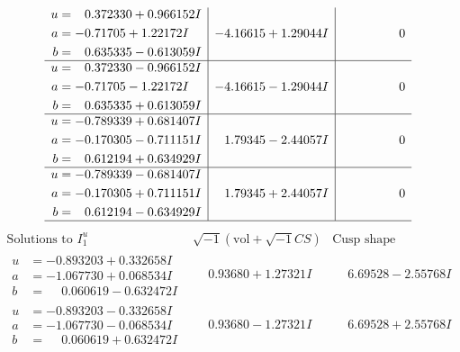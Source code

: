 \documentclass[1p]{elsarticle_modified}
\theoremstyle{definition}
\newcommand{\I}{\sqrt{-1}}
\begin{document}
$$\begin{array}{c|c|c}
\begin{aligned}
u &= \phantom{-}0.372330 + 0.966152 I \\
a &= -0.71705 + 1.22172 I \\
b &= \phantom{-}0.635335 - 0.613059 I\end{aligned}
 & -4.16615 + 1.29044 I & \phantom{-0.000000 } 0 \\ \hline\begin{aligned}
u &= \phantom{-}0.372330 - 0.966152 I \\
a &= -0.71705 - 1.22172 I \\
b &= \phantom{-}0.635335 + 0.613059 I\end{aligned}
 & -4.16615 - 1.29044 I & \phantom{-0.000000 } 0 \\ \hline\begin{aligned}
u &= -0.789339 + 0.681407 I \\
a &= -0.170305 - 0.711151 I \\
b &= \phantom{-}0.612194 + 0.634929 I\end{aligned}
 & \phantom{-}1.79345 - 2.44057 I & \phantom{-0.000000 } 0 \\ \hline\begin{aligned}
u &= -0.789339 - 0.681407 I \\
a &= -0.170305 + 0.711151 I \\
b &= \phantom{-}0.612194 - 0.634929 I\end{aligned}
 & \phantom{-}1.79345 + 2.44057 I & \phantom{-0.000000 } 0\\
 \hline 
 \end{array}$$\newpage$$\begin{array}{c|c|c}  
\text{Solutions to }I^u_{1}& \I (\text{vol} + \sqrt{-1}CS) & \text{Cusp shape}\\
 \hline 
\begin{aligned}
u &= -0.893203 + 0.332658 I \\
a &= -1.067730 + 0.068534 I \\
b &= \phantom{-}0.060619 - 0.632472 I\end{aligned}
 & \phantom{-}0.93680 + 1.27321 I & \phantom{-}6.69528 - 2.55768 I \\ \hline\begin{aligned}
u &= -0.893203 - 0.332658 I \\
a &= -1.067730 - 0.068534 I \\
b &= \phantom{-}0.060619 + 0.632472 I\end{aligned}
 & \phantom{-}0.93680 - 1.27321 I & \phantom{-}6.69528 + 2.55768 I \\ \hline\begin{aligned}

\end{aligned}
\end{array}$$
\end{document}
